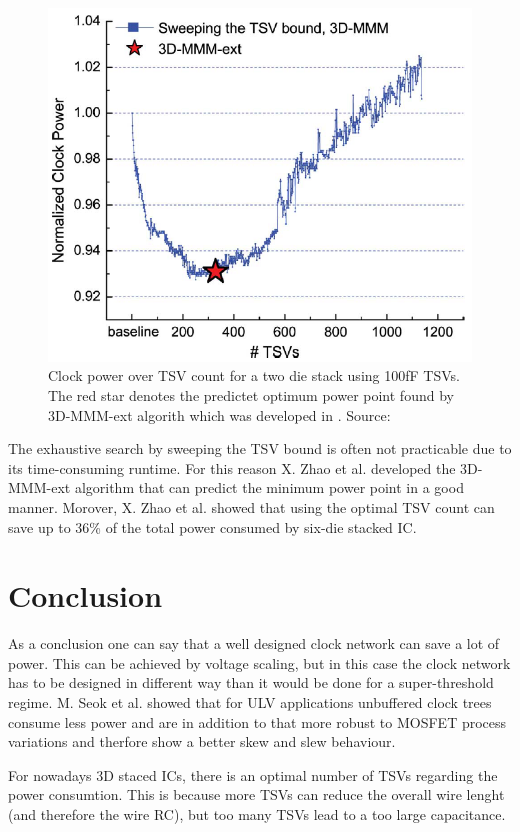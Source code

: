 \documentclass[conference]{IEEEtran}
\begin{document}
\begin{figure}[htbp]
	\includegraphics[width=1\linewidth]{img/tsv_sweep.png}
	\centering
	\caption{Clock power over TSV count for a two die stack using 100fF TSVs. The red star denotes the predictet optimum power point found by 3D-MMM-ext algorith which was developed in \cite{b2}. Source: \cite{b2}}
	\label{fig:tsv_sweep}
\end{figure}

The exhaustive search by sweeping the TSV bound is often not practicable due to its time-consuming runtime. For this reason X. Zhao et al. \cite{b2} developed the 3D-MMM-ext algorithm that can predict the minimum power point in a good manner. Morover, X. Zhao et al. showed that using the optimal TSV count can save up to 36\% of the total power consumed by six-die stacked IC.


\section{Conclusion}
As a conclusion one can say that a well designed clock network can save a lot of power. This can be achieved by voltage scaling, but in this case the clock network has to be designed in different way than it would be done for a super-threshold regime. M. Seok et al. showed that for ULV applications unbuffered clock trees consume less power and are in addition to that more robust to MOSFET process variations and therfore show a better skew and slew behaviour.

For nowadays 3D staced ICs, there is an optimal number of TSVs regarding the power consumtion. This is because more TSVs can reduce the overall wire lenght (and therefore the wire RC), but too many TSVs lead to a too large capacitance.
\end{document}
